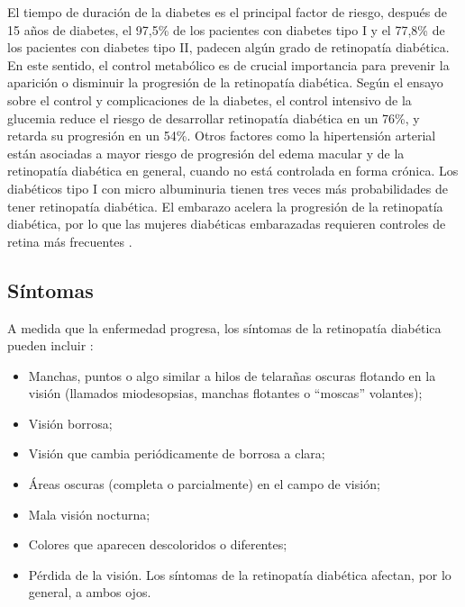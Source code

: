 El tiempo de duración de la diabetes es el principal factor de riesgo, después de 15 años de diabetes, el 97,5\% de los pacientes con diabetes tipo I y el 77,8\% de los pacientes con diabetes tipo II, padecen algún grado de retinopatía diabética. En este sentido, el control metabólico es de crucial importancia para prevenir la aparición o disminuir la progresión de la retinopatía diabética. Según el ensayo sobre el control y complicaciones de la diabetes, el control intensivo de la glucemia reduce el riesgo de desarrollar retinopatía diabética en un 76\%, y retarda su progresión en un 54\%. Otros factores como la hipertensión arterial están asociadas a mayor riesgo de progresión del edema macular y de la retinopatía diabética en general, cuando no está controlada en forma crónica. %
Los diabéticos tipo I con micro albuminuria tienen tres veces más probabilidades de tener retinopatía diabética. El embarazo acelera la progresión de la retinopatía diabética, por lo que las mujeres diabéticas embarazadas requieren controles de retina más frecuentes \cite{retinoUSdep,AAORiesgos}.




\subsection{Síntomas}

A medida que la enfermedad progresa, los síntomas de la retinopatía diabética pueden incluir \cite{AAOSintomas}:
\begin{itemize}
\item Manchas, puntos o algo similar a hilos de telarañas oscuras flotando en la visión (llamados miodesopsias, manchas flotantes o “moscas” volantes);
\item Visión borrosa;
\item Visión que cambia periódicamente de borrosa a clara;
\item Áreas oscuras (completa o parcialmente) en el campo de visión;
\item Mala visión nocturna;
\item Colores que aparecen descoloridos o diferentes;
\item Pérdida de la visión.
Los síntomas de la retinopatía diabética afectan, por lo general, a ambos ojos. 

\end{itemize}



